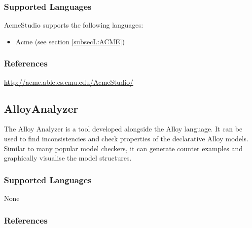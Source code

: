 \subsubsection{Supported Languages}

AcmeStudio supports the following languages:

\begin{itemize}
    \item Acme (see section \ref{subsecL:ACME})
\end{itemize}


\subsubsection{References}
\url{http://acme.able.cs.cmu.edu/AcmeStudio/}




\subsection{AlloyAnalyzer}
\label{subsecT:AlloyAnalyzer}



The Alloy Analyzer is a tool developed alongside the Alloy language. 
It can be used to find inconsistencies and check properties of the declarative Alloy models.
Similar to many popular model checkers, it can generate counter examples and graphically visualise the model structures.


\subsubsection{Supported Languages}

None


\subsubsection{References}





